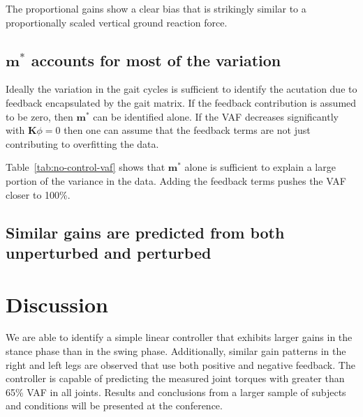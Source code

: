 \documentclass{article}
\begin{document}
The proportional gains show a clear bias that is strikingly similar to a
proportionally scaled vertical ground reaction force.

\subsection*{$\mathbf{m}^*$ accounts for most of the variation}
%
Ideally the variation in the gait cycles is sufficient to identify the
acutation due to feedback encapsulated by the gait matrix. If the feedback
contribution is assumed to be zero, then $\mathbf{m}^*$ can be identified
alone. If the VAF decreases significantly with $\mathbf{K}{\phi}=0$ then one
can assume that the feedback terms are not just contributing to overfitting the
data.
%
\begin{table}
  \cprotect\caption{Generated by \verb|src/table_no_control_vaf_comparison.py|.}
  \centering
  
  \label{tab:no-control-vaf}
\end{table}

Table~\ref{tab:no-control-vaf} shows that $\mathbf{m}^*$ alone is sufficient to
explain a large portion of the variance in the data. Adding the feedback terms
pushes the VAF closer to 100\%.

\subsection*{Similar gains are predicted from both unperturbed and perturbed}
%

\section*{Discussion}
%
We are able to identify a simple linear controller that exhibits larger gains
in the stance phase than in the swing phase. Additionally, similar gain
patterns in the right and left legs are observed that use both positive and
negative feedback. The controller is capable of predicting the measured joint
torques with greater than 65\% VAF in all joints. Results and conclusions from
a larger sample of subjects and conditions will be presented at the conference.

%
\end{document}

